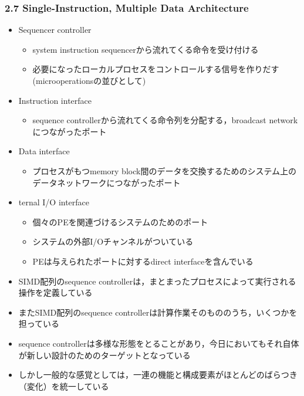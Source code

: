 \documentclass[12pt, unicode, dvipdfmx, t]{beamer}
\begin{document}
\begin{frame}[t]
	\frametitle{2.7 Single-Instruction, Multiple Data Architecture}
	\begin{itemize}
		\item Sequencer controller
		\begin{itemize}
			\item system instruction sequencerから流れてくる命令を受け付ける
			\item 必要になったローカルプロセスをコントロールする信号を作りだす(microoperationsの並びとして)
		\end{itemize}
	\item Instruction interface
		\begin{itemize}
			\item sequence controllerから流れてくる命令列を分配する，broadcast networkにつながったポート
		\end{itemize}
	\item Data interface
		\begin{itemize}
			\item プロセスがもつmemory block間のデータを交換するためのシステム上のデータネットワークにつながったポート
		\end{itemize}
		\item ternal I/O interface
		\begin{itemize}
			\item 個々のPEを関連づけるシステムのためのポート
			\item システムの外部I/Oチャンネルがついている
			\item PEは与えられたポートに対するdirect interfaceを含んでいる
		\end{itemize}
	\end{itemize}
\end{frame}

\begin{frame}[t]
	\begin{itemize}
		\item SIMD配列のsequence controllerは，まとまったプロセスによって実行される操作を定義している
		\item またSIMD配列のsequence controllerは計算作業そのもののうち，いくつかを担っている
		\item sequence controllerは多様な形態をとることがあり，今日においてもそれ自体が新しい設計のためのターゲットとなっている
		\item しかし一般的な感覚としては，一連の機能と構成要素がほとんどのばらつき（変化）を統一している
	\end{itemize}
\end{frame}
\end{document}

